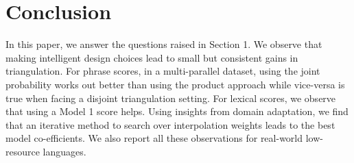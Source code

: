 \documentclass[11pt]{article}
\begin{document}

\section{Conclusion}

In this paper, we answer the questions raised in Section 1. We observe that making intelligent design choices lead to small but consistent gains in triangulation. For phrase scores, in a multi-parallel dataset, using the joint probability works out better than using the product approach while vice-versa is true when facing a disjoint triangulation setting. For lexical scores, we observe that using a Model 1 score helps. Using insights from domain adaptation, we find that an iterative method to search over interpolation weights leads to the best model co-efficients. We also report all these observations for real-world low-resource languages. 



\end{document}
